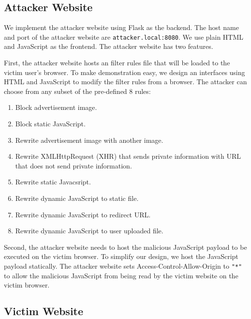 \documentclass[conference]{IEEEtran}
\begin{document}
\subsection{Attacker Website}

We implement the attacker website using Flask as the backend. The host name and port of the attacker website are \lstinline{attacker.local:8080}. We use plain HTML and JavaScript as the frontend. The attacker website has two features.

First, the attacker website hosts an filter rules file that will be loaded to the victim user's browser. To make demonstration easy, we design an interfaces using HTML and JavaScript to modify the filter rules from a browser. The attacker can choose from any subset of the pre-defined 8 rules:

\begin{enumerate}
	\item Block advertisement image.
	\item Block static JavaScript.
	\item Rewrite advertisement image with another image.
	\item Rewrite XMLHttpRequest (XHR) that sends private information with URL that does not send private information.
	\item Rewrite static Javacsript.
	\item Rewrite dynamic JavaScript to static file.
	\item Rewrite dynamic JavaScript to redirect URL.
	\item Rewrite dynamic JavaScript to user uploaded file.
\end{enumerate}

Second, the attacker website needs to host the malicious JavaScript payload to be executed on the victim browser. To simplify our design, we host the JavaScript payload statically. The attacker website sets Access-Control-Allow-Origin to \lstinline{"*"} to allow the malicious JavaScript from being read by the victim website on the victim browser.

\subsection{Victim Website}
\end{document}
